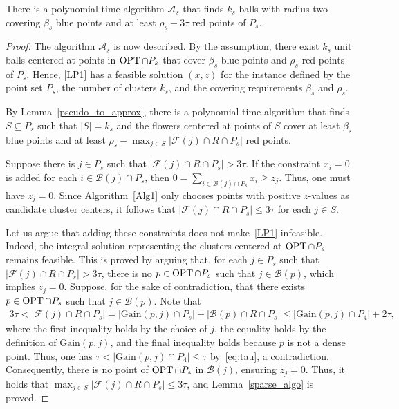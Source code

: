 \begin{lemma}
    \label{sparse_algo}
    There is a polynomial-time algorithm $\mathcal{A}_s$ that finds $k_s$ balls with radius two covering $\beta_s$ blue points and at least $\rho_s - 3\tau$ red points of $P_s$. 
\end{lemma}
\begin{proof}
The algorithm $\mathcal{A}_s$ is now described. By the assumption, there exist $k_s$ unit balls centered at points in $\operatorname{OPT} \cap P_s$ that cover $\beta_s$ blue points and $\rho_s$ red points of $P_s$. Hence, \ref{LP1} has a feasible solution $(x,z)$ for the instance defined by the point set $P_s$, the number of clusters $k_s$, and the covering requirements $\beta_s$ and $\rho_s$.

By Lemma~\ref{pseudo_to_approx}, there is a polynomial-time algorithm that finds $S \subseteq P_s$ such that $|S| = k_s$ and the flowers centered at points of $S$ cover at least $\beta_s$ blue points and at least $\rho_s - \max_{j \in S} |\mathcal{F}(j) \cap R \cap P_s|$ red points. 

Suppose there is $j \in P_s$ such that $|\mathcal{F}(j) \cap R \cap P_s| > 3\tau$. If the constraint $x_i = 0$ is added for each $i \in \mathcal{B}(j) \cap P_s$, then $0 = \sum_{i \in \mathcal{B}(j) \cap P_s} x_i \geq z_j$. Thus, one must have $z_j = 0$. Since {Algorithm~\ref{Alg1}} only chooses points with positive $z$-values as candidate cluster centers, it follows that $|\mathcal{F}(j) \cap R \cap P_s| \leq 3\tau$ for each $j \in S$.

Let us argue that adding these constraints does not make~\ref{LP1} infeasible. Indeed, the integral solution representing the clusters centered at $\operatorname{OPT} \cap P_s$ remains feasible. This is proved by arguing that, for each $j \in P_s$ such that $|\mathcal{F}(j) \cap R \cap P_s| > 3\tau$, there is no $p \in \operatorname{OPT} \cap P_s$ such that $j \in \mathcal{B}(p)$, which implies $z_j = 0$.
Suppose, for the sake of contradiction, that there exists $p \in \operatorname{OPT} \cap P_s$ such that $j \in \mathcal{B}(p)$. Note that
\begin{align*}
    3\tau < |\mathcal{F}(j) \cap R \cap P_s| = |\mathrm{Gain}(p,j) \cap P_s| + |\mathcal{B}(p) \cap R \cap P_s| \leq |\mathrm{Gain}(p,j) \cap P_4| + 2\tau,
\end{align*}
where the first inequality holds by the choice of $j$, the equality holds by the definition of $\mathrm{Gain}(p,j)$, and the final inequality holds because $p$ is not a dense point. Thus, one has $\tau < |\mathrm{Gain}(p,j) \cap P_4| \leq \tau$ by~\eqref{eq:tau}, a contradiction. Consequently, there is no point of $\operatorname{OPT} \cap P_s$ in $\mathcal{B}(j)$, ensuring $z_j = 0$. Thus, it holds that $\max_{j \in S} |\mathcal{F}(j) \cap R \cap P_s| \leq 3\tau$, and Lemma~\ref{sparse_algo} is proved.
\end{proof}
